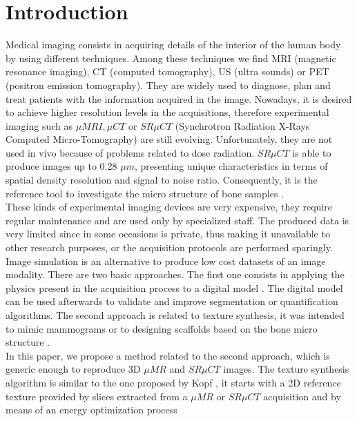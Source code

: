 \documentclass{article}
\begin{document}
\section{Introduction}
\label{sec:intro}
%
Medical imaging consists in acquiring details of the interior of the human body by using different techniques. 
Among these techniques we find MRI (magnetic resonance imaging), CT (computed tomography),
US (ultra sounds) or PET (positron emission tomography). They are widely used to diagnose, plan and treat patients with the information acquired in the image.
Nowadays, it is desired to achieve higher resolution levels in the acquisitions,
therefore experimental imaging such as $\mu{MRI}, \mu{CT}$ or $SR \mu{CT}$ (Synchrotron Radiation X-Rays Computed Micro-Tomography) 
are still evolving. Unfortunately, they are not used in vivo because of problems related to dose radiation.
$SR \mu{CT}$ is able to produce images up to 0.28 $\mu{m}$, presenting
unique characteristics in terms of spatial density resolution and signal to noise ratio.
Consequently, it is the reference tool to investigate the micro structure of bone samples \cite{revol2002}.
\\
These kinds of experimental imaging devices are very expensive, they require regular maintenance and are used only by specialized staff. The produced data is very limited since in some occasions is private, thus making it unavailable to other research purposes, or the acquisition protocols are performed sparingly. Image simulation is an alternative to produce low cost datasets of an image modality. 
There are two basic approaches. The first one consists in 
applying the physics present in the acquisition process to a digital model \cite{CHAR-09}.
The digital model can be used afterwards to validate and improve segmentation or quantification algorithms.
The second approach is related to texture synthesis, it was intended to mimic mammograms \cite{Castella:08} or
to designing scaffolds based on the bone micro structure \cite{DBLP:conf/smi/HoldsteinFPB09}. %
\\
In this paper, we propose a method related to the second approach, which is generic enough to reproduce 3D $\mu{MR}$ and $SR \mu{CT}$ images. 
The texture synthesis algorithm is similar to the one proposed by Kopf \cite{KFCODLW07}, it starts with a 2D reference texture
provided by slices extracted from a $\mu{MR}$ or $SR \mu{CT}$ acquisition and by means of an energy optimization process 
\end{document}
